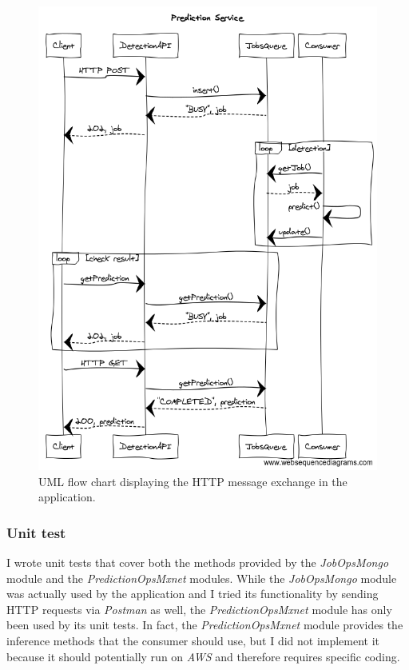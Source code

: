 \begin{figure}[htbp]
\begin{center}
\includegraphics[width=\textwidth]{immagini/pictures/flow.png} 
\caption{UML flow chart displaying the HTTP message exchange in the application.}
\end{center}
\end{figure}


\subsubsection{Unit test}
I wrote unit tests that cover both the methods provided by the \emph{JobOpsMongo} module and the \emph{PredictionOpsMxnet} modules. 
While the \emph{JobOpsMongo} module was actually used by the application and I tried its functionality by sending HTTP requests via \emph{Postman} as well, the \emph{PredictionOpsMxnet} module has only been used by its unit tests. In fact, the \emph{PredictionOpsMxnet} module provides the inference methods that the consumer should use, but I did not implement it because it should potentially run on \emph{AWS} and therefore requires specific coding.

